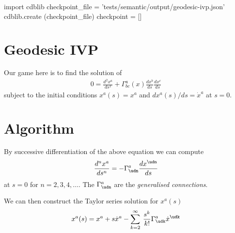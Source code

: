 \documentclass[12pt]{cdblatex}
\begin{document}

\bgroup
{}
\begin{cadabra}
   import cdblib
   checkpoint_file = 'tests/semantic/output/geodesic-ivp.json'
   cdblib.create (checkpoint_file)
   checkpoint = []
\end{cadabra}
\egroup

\section*{Geodesic IVP}

Our game here is to find the solution of
\begin{align*}
   0 = \frac{d^2 x^{a}}{ds^2} + \Gamma^{a}_{bc}(x) \frac{dx^b}{ds} \frac{dx^c}{ds}
\end{align*}
subject to the initial conditions $x^{a}(s) = x^a$ and $dx^a(s)/ds={\Dot x}^{a}$ at $s=0$.

\section*{Algorithm}

By successive differentiation of the above equation we can compute
\begin{align*}
   \frac{d^n x^{a}}{ds^n} = -\Gamma^{a}_{\udn}\frac{dx^{\udn}}{ds}
\end{align*}
at $s=0$ for $n=2,3,4,\dotsc$. The $\Gamma^{a}_{\udn}$ are the \emph{generalised connections}.

We can then construct the Taylor series solution for $x^{a}(s)$
\begin{align*}
   x^a(s) = x^a + s {\Dot x}^a - \sum_{k=2}^\infty\>\frac{s^{k}}{k!} \Gamma^{a}_{\udk}{\Dot x}^{\udk}
\end{align*}

\clearpage
\end{document}
